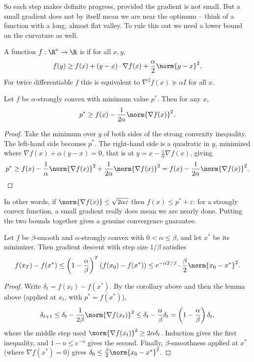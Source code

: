 So each step makes definite progress, provided the gradient is not small. But a small gradient does not by itself mean we are near the optimum -- think of a function with a long, almost flat valley. To rule this out we need a lower bound on the curvature as well.

\begin{definition}
    A function $f : \R^n \rightarrow \R$ is  if for all $x, y$,
    $$
    f(y) \geq f(x) + (y - x)\cdot \nabla f(x) + \frac{\alpha}{2}\norm{y - x}^2.
    $$
    For twice differentiable $f$ this is equivalent to $\nabla^2 f(x) \succeq \alpha I$ for all $x$.
\end{definition}

\begin{lemma}
    Let $f$ be $\alpha$-strongly convex with minimum value $p^*$. Then for any $x$,
    $$
    p^* \geq f(x) - \frac{1}{2\alpha}\norm{\nabla f(x)}^2.
    $$
\end{lemma}
\begin{proof}
    Take the minimum over $y$ of both sides of the strong convexity inequality. The left-hand side becomes $p^*$. The right-hand side is a quadratic in $y$, minimized where $\nabla f(x) + \alpha(y - x) = 0$, that is at $y = x - \frac{1}{\alpha}\nabla f(x)$, giving
    $$
    p^* \geq f(x) - \frac{1}{\alpha}\norm{\nabla f(x)}^2 + \frac{1}{2\alpha}\norm{\nabla f(x)}^2 = f(x) - \frac{1}{2\alpha}\norm{\nabla f(x)}^2. \qedhere
    $$
\end{proof}

In other words, if $\norm{\nabla f(x)} \leq \sqrt{2\alpha\varepsilon}$ then $f(x) \leq p^* + \varepsilon$: for a strongly convex function, a small gradient really does mean we are nearly done. Putting the two bounds together gives a genuine convergence guarantee.

\begin{theorem}
    Let $f$ be $\beta$-smooth and $\alpha$-strongly convex with $0 < \alpha \leq \beta$, and let $x^*$ be its minimizer. Then gradient descent with step size $1/\beta$ satisfies
    $$
    f(x_T) - f(x^*) \leq \left(1 - \frac{\alpha}{\beta}\right)^T\left(f(x_0) - f(x^*)\right) \leq e^{-\alpha T/\beta}\cdot\frac{\beta}{2}\norm{x_0 - x^*}^2.
    $$
\end{theorem}
\begin{proof}
    Write $\delta_t = f(x_t) - f(x^*)$. By the corollary above and then the lemma above (applied at $x_t$, with $p^* = f(x^*)$),
    $$
    \delta_{t+1} \leq \delta_t - \frac{1}{2\beta}\norm{\nabla f(x_t)}^2 \leq \delta_t - \frac{\alpha}{\beta}\delta_t = \left(1 - \frac{\alpha}{\beta}\right)\delta_t,
    $$
    where the middle step used $\norm{\nabla f(x_t)}^2 \geq 2\alpha \delta_t$. Induction gives the first inequality, and $1 - u \leq e^{-u}$ gives the second. Finally, $\beta$-smoothness applied at $x^*$ (where $\nabla f(x^*) = 0$) gives $\delta_0 \leq \frac{\beta}{2}\norm{x_0 - x^*}^2$.
\end{proof}

